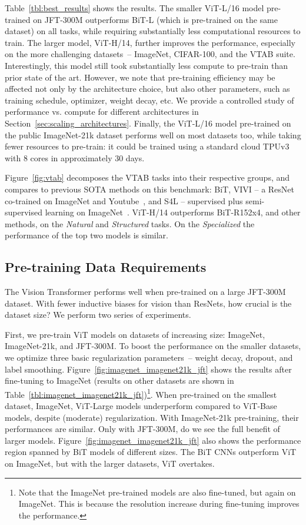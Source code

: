 Table~\ref{tbl:best_results} shows the results. The smaller ViT-L/16 model pre-trained on JFT-300M outperforms BiT-L (which is pre-trained on the same dataset) on all tasks, while requiring substantially less computational resources to train. The larger model, ViT-H/14, further improves the performance, especially on the more challenging datasets~-- ImageNet, CIFAR-100, and the VTAB suite. Interestingly, this model still took substantially less compute to pre-train than prior state of the art. However, we note that pre-training efficiency may be affected not only by the architecture choice, but also other parameters, such as training schedule, optimizer, weight decay, etc. We provide a controlled study of performance vs. compute for different architectures in Section~\ref{sec:scaling_architectures}.
Finally, the ViT-L/16 model pre-trained on the public ImageNet-21k dataset performs well on most datasets too, while taking fewer resources to pre-train: it could be trained using a standard cloud TPUv3 with 8 cores in approximately 30 days.

Figure~\ref{fig:vtab} decomposes the VTAB tasks into their respective groups, and compares to previous SOTA methods on this benchmark: BiT, VIVI -- a ResNet co-trained on ImageNet and Youtube~\citep{vivi}, and S4L -- supervised plus semi-supervised learning on ImageNet~\citep{zhai2019s4l}. ViT-H/14 outperforms BiT-R152x4, and other methods, on the \textit{Natural} and \textit{Structured} tasks. On the \textit{Specialized} the performance of the top two models is similar.

\subsection{Pre-training Data Requirements}
\label{sec:data_efficiency}

The Vision Transformer performs well when pre-trained on a large JFT-300M dataset. With fewer inductive biases for vision than ResNets, how crucial is the dataset size? We perform two series of experiments.

First, we pre-train ViT models on datasets of increasing size: ImageNet, ImageNet-21k, and JFT-300M. To boost the performance on the smaller datasets, we optimize three basic regularization parameters~-- weight decay, dropout, and label smoothing.
Figure~\ref{fig:imagenet_imagenet21k_jft} shows the results after fine-tuning to ImageNet (results on other datasets are shown in Table~\ref{tbl:imagenet_imagenet21k_jft})\footnote{Note that the ImageNet pre-trained models are also fine-tuned, but again on ImageNet. This is because the resolution increase during fine-tuning improves the performance.}. When pre-trained on  the smallest dataset, ImageNet, ViT-Large models underperform compared to ViT-Base models, despite (moderate) regularization. With ImageNet-21k pre-training, their  performances are similar. Only with JFT-300M, do we see the full benefit of larger models.
Figure~\ref{fig:imagenet_imagenet21k_jft} also shows the performance region spanned by BiT models of different sizes. The BiT CNNs outperform ViT on ImageNet, but with the larger datasets, ViT overtakes.

